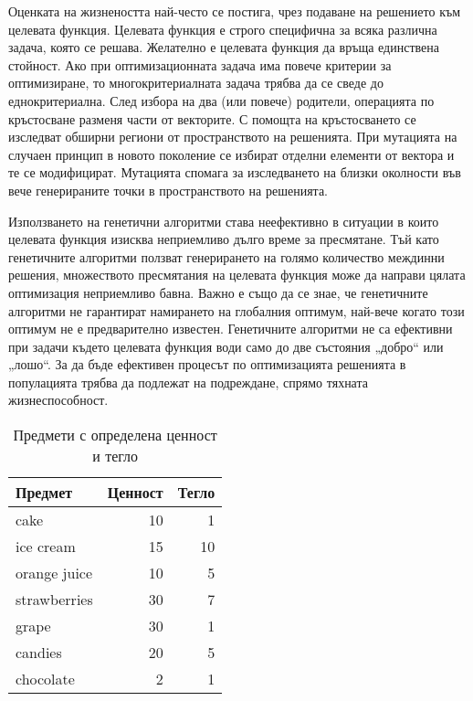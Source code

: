 Оценката на жизнеността най-често се постига, чрез подаване на решението към целевата функция. Целевата функция е строго специфична за всяка различна задача, която се решава. Желателно е целевата функция да връща единствена стойност. Ако при оптимизационната задача има повече критерии за оптимизиране, то многокритериалната задача трябва да се сведе до еднокритериална. След избора на два (или повече) родители, операцията по кръстосване разменя части от векторите. С помощта на кръстосването се изследват обширни региони от пространството на решенията. При мутацията на случаен принцип в новото поколение се избират отделни елементи от вектора и те се модифицират. Мутацията спомага за изследването на близки околности във вече генерираните точки в пространството на решенията. 

Използването на генетични алгоритми става неефективно в ситуации в които целевата функция изисква неприемливо дълго време за пресмятане. Тъй като генетичните алгоритми ползват генерирането на голямо количество междинни решения, множеството пресмятания на целевата функция може да направи цялата оптимизация неприемливо бавна. Важно е също да се знае, че генетичните алгоритми не гарантират намирането на глобалния оптимум, най-вече когато този оптимум не е предварително известен. Генетичните алгоритми не са ефективни при задачи където целевата функция води само до две състояния „добро“ или „лошо“. За да бъде ефективен процесът по оптимизацията решенията в популацията трябва да подлежат на подреждане, спрямо тяхната жизнеспособност. 

\begin{table}[h!]
\centering
\begin{tabular}{|l|r|r|} 
  \rowcolor{lightgray}
  \hline
  Предмет & Ценност & Тегло \\ [0.1ex] 
  \hline\hline
  cake & 10 & 1 \\
  \hline
  ice cream & 15 & 10 \\
  \hline
  orange juice & 10 & 5 \\
  \hline
  strawberries & 30 & 7 \\
  \hline
  grape & 30 & 1 \\
  \hline
  candies & 20 & 5 \\
  \hline
  chocolate & 2 & 1 \\
  \hline
\end{tabular}
\caption{Предмети с определена ценност и тегло}
\label{table0006}
\end{table}

